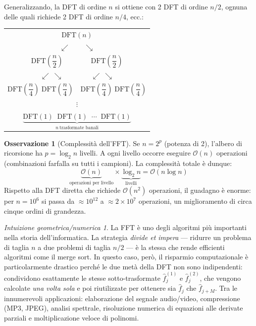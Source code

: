 \documentclass[a4paper,12pt]{article}
\theoremstyle{definition}
\newtheorem{osservazione}{Osservazione}[section]
\theoremstyle{remark}
\newtheorem*{intuizione}{Intuizione geometrica/numerica}
\begin{document}
Generalizzando, la DFT di ordine $n$ si ottiene con 2 DFT di ordine
$n/2$, ognuna delle quali richiede 2 DFT di ordine $n/4$, ecc.:

\medskip
\begin{center}
\renewcommand{\arraystretch}{2.0}
\begin{tabular}{c}
  $\mathrm{DFT}(n)$ \\
  $\swarrow\qquad\searrow$ \\
  $\mathrm{DFT}\!\left(\dfrac{n}{2}\right)
   \qquad\qquad
   \mathrm{DFT}\!\left(\dfrac{n}{2}\right)$ \\[4pt]
  $\swarrow\ \searrow \qquad\qquad \swarrow\ \searrow$ \\
  $\mathrm{DFT}\!\left(\dfrac{n}{4}\right)\;
   \mathrm{DFT}\!\left(\dfrac{n}{4}\right)
   \quad
   \mathrm{DFT}\!\left(\dfrac{n}{4}\right)\;
   \mathrm{DFT}\!\left(\dfrac{n}{4}\right)$ \\
  $\vdots$ \\[2pt]
  $\underbrace{
     \mathrm{DFT}(1)\;\; \mathrm{DFT}(1)\;\; \cdots\;\; \mathrm{DFT}(1)
   }_{n\ \text{trasformate banali}}$
\end{tabular}
\end{center}
\medskip

\begin{osservazione}[Complessità dell'FFT]
Se $n = 2^p$ (potenza di 2), l'albero di ricorsione ha $p = \log_2 n$
livelli. A ogni livello occorre eseguire $\mathcal{O}(n)$ operazioni
(combinazioni farfalla su tutti i campioni). La complessità totale è
dunque:
\[
  \underbrace{\mathcal{O}(n)}_{\text{operazioni per livello}}
  \times
  \underbrace{\log_2 n}_{\text{livelli}}
  = \mathcal{O}(n \log n)
\]
Rispetto alla DFT diretta che richiede $\mathcal{O}(n^2)$ operazioni,
il guadagno è enorme: per $n = 10^6$ si passa da $\approx 10^{12}$
a $\approx 2 \times 10^7$ operazioni, un miglioramento di circa cinque
ordini di grandezza.
\end{osservazione}

\begin{intuizione}
La FFT è uno degli algoritmi più importanti nella storia dell'informatica.
La strategia \emph{divide et impera} — ridurre un problema di taglia $n$
a due problemi di taglia $n/2$ — è la stessa che rende efficienti
algoritmi come il merge sort. In questo caso, però, il risparmio
computazionale è particolarmente drastico perché le due metà della DFT
non sono indipendenti: condividono esattamente le stesse sotto-trasformate
$\hat{f}_j^{(1)}$ e $\hat{f}_j^{(2)}$, che vengono calcolate
\emph{una volta sola} e poi riutilizzate per ottenere sia $\hat{f}_j$
che $\hat{f}_{j+M}$. Tra le innumerevoli applicazioni: elaborazione del
segnale audio/video, compressione (MP3, JPEG), analisi spettrale,
risoluzione numerica di equazioni alle derivate parziali e moltiplicazione
veloce di polinomi.
\end{intuizione}
\end{document}
